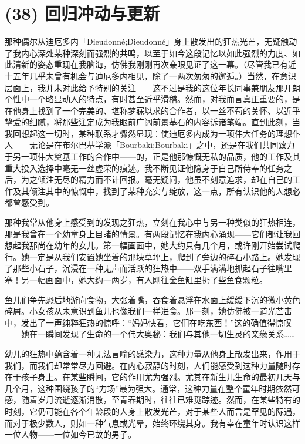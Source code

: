 \section{(38) 回归冲动与更新}

那种偶尔从迪厄多内「Dieudonné;Dieudonné」身上散发出的狂热光芒，无疑触动了我内心深处某种深刻而强烈的共鸣，以至于如今这段记忆以如此强烈的力度、如此清新的姿态重现在我脑海，仿佛我刚刚再次亲眼见证了这一幕。（尽管我已有近十五年几乎未曾有机会与迪厄多内相见，除了一两次匆匆的邂逅。）当然，在意识层面上，我并未对此给予特别的关注——这不过是我的这位年长同事兼朋友那开朗个性中一个略显动人的特点，有时甚至近乎滑稽。然而，对我而言真正重要的，是在他身上找到了一个完美的、堪称梦寐以求的合作者，以一丝不苟的关怀、以近乎挚爱的细腻，将那些注定成为我眼前广阔前景基石的内容诉诸笔端。直到此刻，当我回想起这一切时，某种联系才骤然显现：使迪厄多内成为一项伟大任务的理想仆人——无论是在布尔巴基学派「Bourbaki;Bourbaki」之中，还是在我们共同致力于另一项伟大奠基工作的合作中——的，正是他那慷慨无私的品质，他的工作及其重大投入选择中毫无一丝虚荣的痕迹。我不断见证他隐身于自己所侍奉的任务之后，为之倾注无尽的精力而不计回报。毫无疑问，他虽不刻意追求，却在自己的工作及其倾注其中的慷慨中，找到了某种充实与绽放，这一点，所有认识他的人想必都曾感受到。

那种我常从他身上感受到的发现之狂热，立刻在我心中与另一种类似的狂热相连，那是我曾在一个幼童身上目睹的情景。有两段记忆在我内心涌现——它们都让我回想起我那尚在幼年的女儿。第一幅画面中，她大约只有几个月，或许刚开始尝试爬行。她一定是从我们安置她坐着的那块草坪上，爬到了旁边的碎石小路上。她发现了那些小石子，沉浸在一种无声而活跃的狂热中——双手满满地抓起石子往嘴里塞！另一幅画面中，她大约一两岁，有人刚往金鱼缸里扔了些鱼食颗粒。

鱼儿们争先恐后地游向食物，大张着嘴，吞食着悬浮在水面上缓缓下沉的微小黄色碎屑。小女孩从未意识到鱼儿也像我们一样进食。那一刻，她仿佛被一道光芒击中，发出了一声纯粹狂热的惊呼：“妈妈快看，它们在吃东西！”这的确值得惊叹——她在一瞬间发现了生命的一个伟大奥秘：我们与其他一切生灵的亲缘关系……

幼儿的狂热中蕴含着一种无法言喻的感染力，这种力量从他身上散发出来，作用于我们，而我们却常常尽力回避。在内心寂静的时刻，人们能感受到这种力量随时存在于孩子身上。在某些瞬间，它的作用尤为强烈。尤其在新生儿生命的最初几天与几个月，这种围绕孩子的“力场”最为强大。通常，这种力量在整个童年时期依然可感，随着岁月流逝逐渐消散，至青春期时，往往已难觅踪迹。然而，在某些特有的时刻，它仍可能在各个年龄段的人身上散发光芒，对于某些人而言是罕见的际遇，而对于极少数人，则如一种气息或光晕，始终环绕其身。我有幸在童年时认识这样一位人物——一位如今已故的男子。

